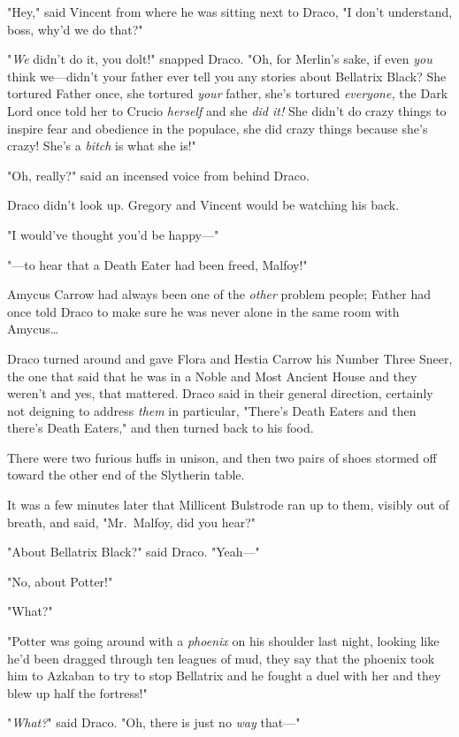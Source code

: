 "Hey," said Vincent from where he was sitting next to Draco, "I don't 
understand, boss, why'd we do that?"

"\emph{We} didn't do it, you dolt!" snapped Draco. "Oh, for Merlin's sake, if 
even \emph{you} think we---didn't your father ever tell you any stories about 
Bellatrix Black? She tortured Father once, she tortured \emph{your} father, 
she's tortured \emph{everyone,} the Dark Lord once told her to Crucio 
\emph{herself} and she \emph{did it!} She didn't do crazy things to inspire 
fear and obedience in the populace, she did crazy things because she's crazy! 
She's a \emph{bitch} is what she is!"

"Oh, really?" said an incensed voice from behind Draco.

Draco didn't look up. Gregory and Vincent would be watching his back.

"I would've thought you'd be happy---"

"---to hear that a Death Eater had been freed, Malfoy!"

Amycus Carrow had always been one of the \emph{other} problem people; Father 
had once told Draco to make sure he was never alone in the same room with 
Amycus{\ldots}

Draco turned around and gave Flora and Hestia Carrow his Number Three Sneer, 
the one that said that he was in a Noble and Most Ancient House and they 
weren't and yes, that mattered. Draco said in their general direction, 
certainly not deigning to address \emph{them} in particular, "There's Death 
Eaters and then there's Death Eaters," and then turned back to his food.

There were two furious huffs in unison, and then two pairs of shoes stormed off 
toward the other end of the Slytherin table.

It was a few minutes later that Millicent Bulstrode ran up to them, visibly out 
of breath, and said, "Mr.~Malfoy, did you hear?"

"About Bellatrix Black?" said Draco. "Yeah---"

"No, about Potter!"

"What?"

"Potter was going around with a \emph{phoenix} on his shoulder last night, 
looking like he'd been dragged through ten leagues of mud, they say that the 
phoenix took him to Azkaban to try to stop Bellatrix and he fought a duel with 
her and they blew up half the fortress!"

"\emph{What?}" said Draco. "Oh, there is just no \emph{way} that---"

